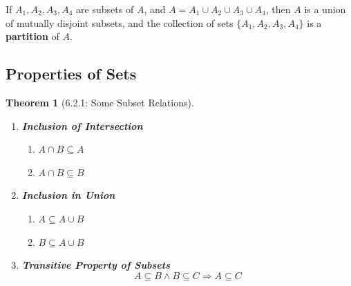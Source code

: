 \documentclass{article}
\theoremstyle{plain}
\newtheorem{theorem}{Theorem}[section]
\theoremstyle{definition}
\theoremstyle{remark}
\begin{document}
If $A_1, A_2, A_3, A_4$ are subsets of $A$, and $A = A_1 \cup A_2 \cup A_3 \cup A_4$, then $A$ is a union of mutually disjoint subsets, and the collection of sets $\{A_1, A_2, A_3, A_4\}$ is a \textbf{partition} of $A$.

\subsection{Properties of Sets}

\begin{theorem}[6.2.1: Some Subset Relations]
\hfill
\begin{enumerate}[label=\arabic*.]
    \item \textbf{Inclusion of Intersection}
    \begin{enumerate}[label=(\alph*)]
        \item $A \cap B \subseteq A$
        \item $A \cap B \subseteq B$
    \end{enumerate}
    \item \textbf{Inclusion in Union}
    \begin{enumerate}[label=(\alph*)]
        \item $A \subseteq A \cup B$
        \item $B \subseteq A \cup B$
    \end{enumerate}
    \item \textbf{Transitive Property of Subsets}
    \[A \subseteq B \wedge B \subseteq C \Rightarrow A \subseteq C\]
\end{enumerate}
\end{theorem}
\end{document}
